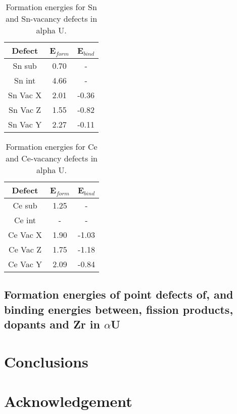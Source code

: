 \documentclass[review]{elsarticle}
\begin{document}
\begin{table}[h!]
\caption{Formation energies for Sn and Sn-vacancy defects in alpha U.}
\label{tab:Eforms}
\begin{center}
\begin{tabular}{|c|c|c|}
     \hline
      Defect & E$_{form}$ & E$_{bind}$ \\
     \hline
     Sn sub & 0.70 & - \\
     Sn int & 4.66 & - \\
     Sn Vac X & 2.01 & -0.36 \\
     Sn Vac Z & 1.55 & -0.82 \\
     Sn Vac Y & 2.27 & -0.11 \\
       \hline
\end{tabular}
\end{center}
\label{default}
\end{table}%


\begin{table}[h!]
\caption{Formation energies for Ce and Ce-vacancy defects in alpha U.}
\label{tab:Eforms}
\begin{center}
\begin{tabular}{|c|c|c|}
     \hline
      Defect & E$_{form}$ & E$_{bind}$ \\
     \hline
     Ce sub & 1.25 & - \\
     Ce int & - & - \\
     Ce Vac X & 1.90 & -1.03 \\
     Ce Vac Z & 1.75 & -1.18 \\
     Ce Vac Y & 2.09 & -0.84 \\
       \hline
\end{tabular}
\end{center}
\label{default}
\end{table}%

\FloatBarrier

\subsection{Formation energies of point defects of, and binding energies between, fission products, dopants and Zr in $\alpha$U}



\FloatBarrier
\section{Conclusions}


\section{Acknowledgement}


\FloatBarrier


\end{document}
